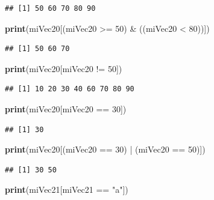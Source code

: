 \documentclass[twoside,symmetric]{book}
\newenvironment{Shaded}{}{}
\newcommand{\DecValTok}[1]{#1}
\newcommand{\KeywordTok}[1]{\textbf{#1}}
\newcommand{\NormalTok}[1]{#1}
\newcommand{\OperatorTok}[1]{#1}
\newcommand{\StringTok}[1]{#1}
\begin{document}
\begin{verbatim}
## [1] 50 60 70 80 90
\end{verbatim}

\begin{Shaded}
\begin{Highlighting}[]
\KeywordTok{print}\NormalTok{(miVec20[(miVec20 }\OperatorTok{>=}\StringTok{ }\DecValTok{50}\NormalTok{) }\OperatorTok{&}\StringTok{ }\NormalTok{((miVec20 }\OperatorTok{<}\StringTok{ }\DecValTok{80}\NormalTok{))])}
\end{Highlighting}
\end{Shaded}

\begin{verbatim}
## [1] 50 60 70
\end{verbatim}

\begin{Shaded}
\begin{Highlighting}[]
\KeywordTok{print}\NormalTok{(miVec20[miVec20 }\OperatorTok{!=}\StringTok{ }\DecValTok{50}\NormalTok{])}
\end{Highlighting}
\end{Shaded}

\begin{verbatim}
## [1] 10 20 30 40 60 70 80 90
\end{verbatim}

\begin{Shaded}
\begin{Highlighting}[]
\KeywordTok{print}\NormalTok{(miVec20[miVec20 }\OperatorTok{==}\StringTok{ }\DecValTok{30}\NormalTok{])}
\end{Highlighting}
\end{Shaded}

\begin{verbatim}
## [1] 30
\end{verbatim}

\begin{Shaded}
\begin{Highlighting}[]
\KeywordTok{print}\NormalTok{(miVec20[(miVec20 }\OperatorTok{==}\StringTok{ }\DecValTok{30}\NormalTok{) }\OperatorTok{|}\StringTok{ }\NormalTok{(miVec20 }\OperatorTok{==}\StringTok{ }\DecValTok{50}\NormalTok{)])}
\end{Highlighting}
\end{Shaded}

\begin{verbatim}
## [1] 30 50
\end{verbatim}

\begin{Shaded}
\begin{Highlighting}[]
\KeywordTok{print}\NormalTok{(miVec21[miVec21 }\OperatorTok{==}\StringTok{ "a"}\NormalTok{])}
\end{Highlighting}
\end{Shaded}
\end{document}
